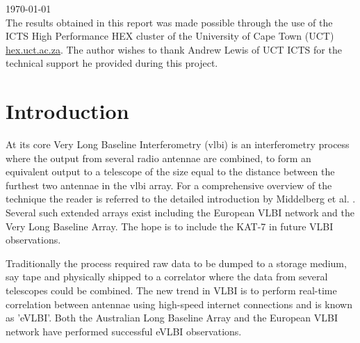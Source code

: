 \documentclass[a4paper,10pt]{article}
\begin{document}
\begin{titlepage}

{\large \today}\\[3cm] %
{The results obtained in this report was made possible through the use of the ICTS High Performance HEX cluster 
of the University of Cape Town (UCT) \url{hex.uct.ac.za}. The author wishes to thank Andrew Lewis of UCT ICTS for 
the technical support he provided during this project.}

 

\vfill %

\end{titlepage}

\printglossary[style=long]
\pagebreak
\tableofcontents
\pagebreak
\section{Introduction}
At its core Very Long Baseline Interferometry (\gls{vlbi}) is an interferometry process where the output from several radio antennae are 
combined, to form an equivalent output to a telescope of the size equal to the distance between the furthest two antennae in the \gls{vlbi} array.
For a comprehensive overview of the technique the reader is referred to the detailed introduction by Middelberg et al. \cite{middelberg2008high}. Several
such extended arrays exist including the European VLBI network and the Very Long Baseline Array. The hope is to include the KAT-7 in future VLBI
observations.

Traditionally the process required raw data to be dumped to a storage medium, say tape and physically shipped to a correlator where the data from several 
telescopes could be combined. The new trend in VLBI is to perform real-time correlation between antennae using high-speed internet connections and is known
as 'eVLBI'. Both the Australian Long Baseline Array and the European VLBI network have performed successful eVLBI observations.
\end{document}
